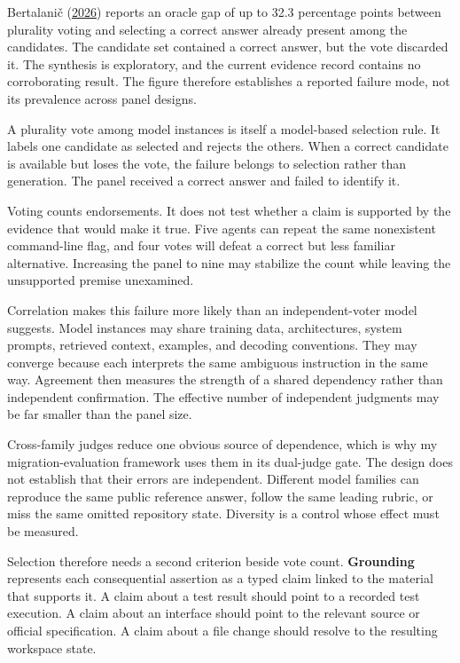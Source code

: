 Bertalani\v{c} (\href{https://arxiv.org/abs/2605.00914}{2026}) reports an oracle gap of up to 32.3 percentage points between plurality voting and selecting a correct answer already present among the candidates. The candidate set contained a correct answer, but the vote discarded it. The synthesis is exploratory, and the current evidence record contains no corroborating result. The figure therefore establishes a reported failure mode, not its prevalence across panel designs.

A plurality vote among model instances is itself a model-based selection rule. It labels one candidate as selected and rejects the others. When a correct candidate is available but loses the vote, the failure belongs to selection rather than generation. The panel received a correct answer and failed to identify it.

Voting counts endorsements. It does not test whether a claim is supported by the evidence that would make it true. Five agents can repeat the same nonexistent command-line flag, and four votes will defeat a correct but less familiar alternative. Increasing the panel to nine may stabilize the count while leaving the unsupported premise unexamined.

Correlation makes this failure more likely than an independent-voter model suggests. Model instances may share training data, architectures, system prompts, retrieved context, examples, and decoding conventions. They may converge because each interprets the same ambiguous instruction in the same way. Agreement then measures the strength of a shared dependency rather than independent confirmation. The effective number of independent judgments may be far smaller than the panel size.

Cross-family judges reduce one obvious source of dependence, which is why my migration-evaluation framework uses them in its dual-judge gate. The design does not establish that their errors are independent. Different model families can reproduce the same public reference answer, follow the same leading rubric, or miss the same omitted repository state. Diversity is a control whose effect must be measured.

Selection therefore needs a second criterion beside vote count. \textbf{Grounding} represents each consequential assertion as a typed claim linked to the material that supports it. A claim about a test result should point to a recorded test execution. A claim about an interface should point to the relevant source or official specification. A claim about a file change should resolve to the resulting workspace state.

